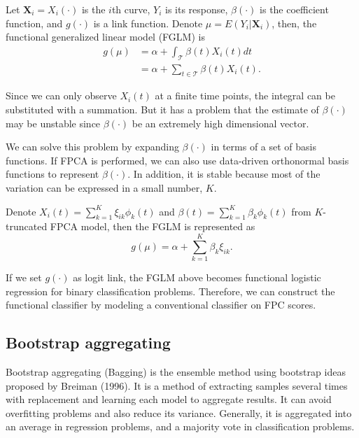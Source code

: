 \documentclass[eng]{csam}
\def \bX { \mathbf{ X } }
\begin{document}
Let $\bX_i = X_i(\cdot)$ is the $i$th curve, $Y_i$ is its response, $\beta(\cdot)$ is the coefficient function, and $g(\cdot)$ is a link function. Denote $\mu = E(Y_i | \bX_i)$, then, the functional generalized linear model (FGLM) is
\begin{align*}
	g(\mu) &= \alpha + \int_{\mathcal{T}} \beta(t) X_i(t) dt \\
	       &= \alpha + \sum_{t \in \mathcal{T}} \beta(t) X_i(t).
\end{align*}

Since we can only observe $X_i(t)$ at a finite time points, the integral can be substituted with a summation. But it has a problem that the estimate of $\beta(\cdot)$ may be unstable since $\beta(\cdot)$ be an extremely high dimensional vector.

We can solve this problem by expanding $\beta(\cdot)$ in terms of a set of basis functions. If FPCA is performed, we can also use data-driven orthonormal basis functions to represent $\beta(\cdot)$. In addition, it is stable because most of the variation can be expressed in a small number, $K$.

Denote $X_i(t) = \sum_{k=1}^K \xi_{ik} \phi_k(t)$ and $\beta(t) = \sum_{k=1}^K \beta_k \phi_k(t)$ from $K$-truncated FPCA model, then the FGLM is represented as
\begin{equation*}
	g(\mu) = \alpha + \sum_{k=1}^K \beta_k \xi_{ik}.
\end{equation*}

If we set $g(\cdot)$ as logit link, the FGLM above becomes functional logistic regression for binary classification problems. Therefore, we can construct the functional classifier by modeling a conventional classifier on FPC scores.



\subsection{Bootstrap aggregating}
Bootstrap aggregating (Bagging) is the ensemble method using bootstrap ideas proposed by Breiman (1996). It is a method of extracting samples several times with replacement and learning each model to aggregate results. It can avoid overfitting problems and also reduce its variance. 
Generally, it is aggregated into an average in regression problems, and a majority vote in classification problems.
\end{document}
